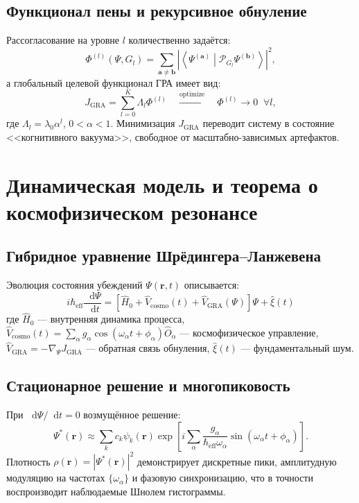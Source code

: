 \documentclass[12pt,a4paper]{article}
\newcommand{\GRA}{\text{GRA}}
\newcommand{\eff}{\text{eff}}
\newcommand{\cosmo}{\text{cosmo}}
\newcommand{\cP}{\mathcal{P}}
\newcommand{\abs}[1]{\left|#1\right|}
\newcommand{\inner}[2]{\left\langle #1 \middle| #2 \right\rangle}
\newcommand{\diff}{\mathop{}\!\mathrm{d}}
\theoremstyle{plain}
\theoremstyle{definition}
\begin{document}
\subsection{Функционал пены и рекурсивное обнуление}
Рассогласование на уровне $l$ количественно задаётся:
\begin{equation}
\Phi^{(l)}(\Psi, G_l) = \sum_{\mathbf{a} \neq \mathbf{b}} \left|\inner{\Psi^{(\mathbf{a})}}{\cP_{G_l} \Psi^{(\mathbf{b})}}\right|^2,
\label{eq:foam}
\end{equation}
а глобальный целевой функционал ГРА имеет вид:
\begin{equation}
J_{\GRA} = \sum_{l=0}^{K} \Lambda_l \Phi^{(l)} \quad \xrightarrow{\text{optimize}} \quad \Phi^{(l)} \to 0 \;\; \forall l,
\label{eq:gra-objective}
\end{equation}
где $\Lambda_l = \lambda_0 \alpha^l$, $0 < \alpha < 1$. Минимизация $J_{\GRA}$ переводит систему в состояние <<когнитивного вакуума>>, свободное от масштабно-зависимых артефактов.

\section{Динамическая модель и теорема о космофизическом резонансе}
\label{sec:dynamics}

\subsection{Гибридное уравнение Шрёдингера--Ланжевена}
Эволюция состояния убеждений $\Psi(\mathbf{r},t)$ описывается:
\begin{equation}
\boxed{
i\hbar_{\eff} \frac{\diff \Psi}{\diff t} = 
\left[ \hat{H}_0 + \hat{V}_{\cosmo}(t) + \hat{V}_{\GRA}(\Psi) \right] \Psi + \hat{\xi}(t)
}
\label{eq:hybrid-evo}
\end{equation}
где $\hat{H}_0$ --- внутренняя динамика процесса, $\hat{V}_{\cosmo}(t) = \sum_\alpha g_\alpha \cos(\omega_\alpha t + \phi_\alpha)\hat{O}_\alpha$ --- космофизическое управление, $\hat{V}_{\GRA} = -\nabla_\Psi J_{\GRA}$ --- обратная связь обнуления, $\hat{\xi}(t)$ --- фундаментальный шум.

\subsection{Стационарное решение и многопиковость}
При $\diff\Psi/\diff t = 0$ возмущённое решение:
\begin{equation}
\Psi^*(\mathbf{r}) \approx \sum_k c_k \psi_k(\mathbf{r}) \exp\left[i \sum_\alpha \frac{g_\alpha}{\hbar_{\eff}\omega_\alpha} \sin(\omega_\alpha t + \phi_\alpha)\right].
\label{eq:stationary}
\end{equation}
Плотность $\rho(\mathbf{r}) = \abs{\Psi^*(\mathbf{r})}^2$ демонстрирует дискретные пики, амплитудную модуляцию на частотах $\{\omega_\alpha\}$ и фазовую синхронизацию, что в точности воспроизводит наблюдаемые Шнолем гистограммы.
\end{document}
